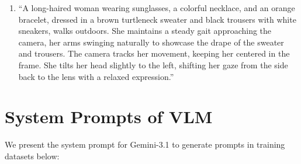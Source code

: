 \begin{enumerate}
% 
\item ``A long-haired woman wearing sunglasses, a colorful necklace, and an orange bracelet, dressed in a brown turtleneck sweater and black trousers with white sneakers, walks outdoors. She maintains a steady gait approaching the camera, her arms swinging naturally to showcase the drape of the sweater and trousers. The camera tracks her movement, keeping her centered in the frame. She tilts her head slightly to the left, shifting her gaze from the side back to the lens with a relaxed expression.''
\end{enumerate}



\section{System Prompts of VLM}
\label{sec:system_prompt}
% 
We present the system prompt for Gemini-3.1 to generate prompts in training datasets below:
% 
